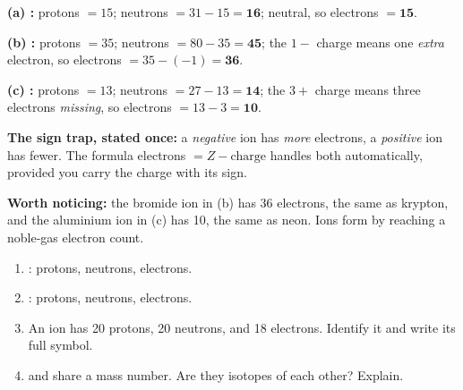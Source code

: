 \documentclass{apchem-worksheet}
\begin{document}
\begin{workedexample}
\textbf{(a) :} protons $= 15$; neutrons $= 31 - 15 =
\mathbf{16}$; neutral, so electrons $= \mathbf{15}$.

\textbf{(b) :} protons $= 35$; neutrons $= 80 - 35 =
\mathbf{45}$; the $1-$ charge means one \emph{extra} electron, so
electrons $= 35 - (-1) = \mathbf{36}$.

\textbf{(c) :} protons $= 13$; neutrons
$= 27 - 13 = \mathbf{14}$; the $3+$ charge means three electrons
\emph{missing}, so electrons $= 13 - 3 = \mathbf{10}$.

\textbf{The sign trap, stated once:} a \emph{negative} ion has
\emph{more} electrons, a \emph{positive} ion has fewer. The formula
electrons $= Z - \text{charge}$ handles both automatically, provided you
carry the charge with its sign.

\textbf{Worth noticing:} the bromide ion in (b) has 36 electrons, the
same as krypton, and the aluminium ion in (c) has 10, the same as neon.
Ions form by reaching a noble-gas electron count.
\end{workedexample}

\begin{yourturn}
\begin{enumerate}[leftmargin=*,itemsep=0.5em]
  \item {}: protons, neutrons, electrons.
        \workspace[1.4cm]
  \item {}: protons, neutrons, electrons.
        \workspace[1.4cm]
  \item An ion has 20 protons, 20 neutrons, and 18 electrons. Identify it
        and write its full symbol. \workspace[1.6cm]
  \item {} and  share a mass number. Are they
        isotopes of each other? Explain. \workspace[1.6cm]
\end{enumerate}
\end{yourturn}
\end{document}
